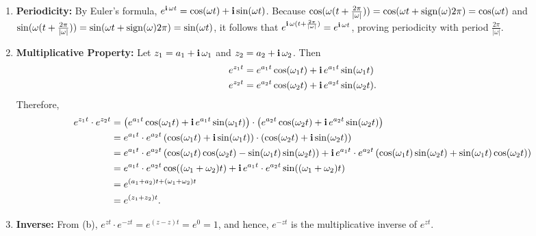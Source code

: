 \begin{enumerate}
\renewcommand{\labelenumi}{(\alph{enumi})}
\setlength{\itemsep}{1cm}
   
    \item \textbf{Periodicity:} By Euler's formula,  $e^{\mathop{\bm{\mathrm i}} \omega t} = \cos(\omega t) + \mathop{\bm{\mathrm i}} \sin(\omega t)$.  Because $ \cos(\omega (t +  \frac{2\pi}{|\omega|} )) = \cos(\omega t +  \mathrm{sign}(\omega){2\pi}) = \cos(\omega t)$ and $ \sin(\omega (t +  \frac{2\pi}{|\omega|} )) = \sin(\omega t +  \mathrm{sign}(\omega){2\pi}) = \sin(\omega t)$, it follows that  $e^{\mathop{\bm{\mathrm i}} \omega (t + \frac{2\pi}{|\omega|})}  = e^{\mathop{\bm{\mathrm i}} \omega t}$, proving periodicity with period  $\frac{2\pi}{|\omega|}$.

    \item \textbf{Multiplicative Property:} Let $z_1 = a_1 + \mathop{\bm{\mathrm i}} \omega_1$ and $z_2 = a_2 + \mathop{\bm{\mathrm i}} \omega_2$. Then
    \begin{align*}
        e^{z_1 t} & = e^{a_1 t} \cos(\omega_1 t) + \mathop{\bm{\mathrm i}}  e^{a_1 t} \sin(\omega_1 t) \\
         e^{z_2 t} & = e^{a_2 t} \cos(\omega_2t) + \mathop{\bm{\mathrm i}}  e^{a_2 t} \sin(\omega_2 t).
    \end{align*}
    Therefore, 
       \begin{align*}
        e^{z_1 t} \cdot e^{z_2 t} & = \left(e^{a_1 t} \cos(\omega_1 t) + \mathop{\bm{\mathrm i}}  e^{a_1 t} \sin(\omega_1 t) \right) \cdot \left( e^{a_2 t} \cos(\omega_2t) + \mathop{\bm{\mathrm i}}  e^{a_2 t} \sin(\omega_2 t) \right)  \\
        &= e^{a_1 t} \cdot e^{a_2 t} \left( \cos(\omega_1 t) + \mathop{\bm{\mathrm i}}  \sin(\omega_1 t) \right) \cdot \left(\cos(\omega_2t) + \mathop{\bm{\mathrm i}}  \sin(\omega_2 t) \right) \\
        &=  e^{a_1 t} \cdot e^{a_2 t} \left( \cos(\omega_1 t) \cos(\omega_2t) - \sin(\omega_1 t) \sin(\omega_2 t) \right) + \mathop{\bm{\mathrm i}} e^{a_1 t} \cdot e^{a_2 t} \left( \cos(\omega_1 t) \sin(\omega_2t) + \sin(\omega_1 t) \cos(\omega_2 t) \right) \\
        &= e^{a_1 t} \cdot e^{a_2 t} \cos( (\omega_1 +\omega_2)t)  + \mathop{\bm{\mathrm i}} e^{a_1 t} \cdot e^{a_2 t} \sin( (\omega_1 +\omega_2)t) \\
        &= e^{(a_1+a_2) t + (\omega_1 + \omega_2)t} \\
        &= e^{(z_1 + z_2)t}.
    \end{align*}

    \item \textbf{Inverse:} From (b), $e^{zt} \cdot e^{-zt} = e^{(z - z)t} = e^0 = 1$, and hence, $e^{-zt}$ is the multiplicative inverse of $e^{zt}$.


\end{enumerate}

